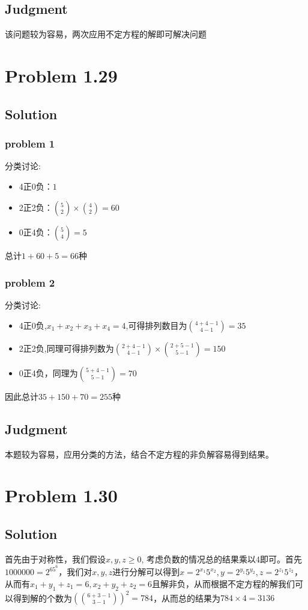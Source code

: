 \documentclass[a4paper]{ctexart}
\begin{document}
\subsection{Judgment}
该问题较为容易，两次应用不定方程的解即可解决问题
\section{Problem 1.29}
\subsection{Solution}
\subsubsection{problem 1}
分类讨论:
\begin{itemize}
    \item 4正0负：$1$
    \item 2正2负：$\binom{5}{2}\times\binom{4}{2}=60$
    \item 0正4负：$\binom{5}{4}=5$
\end{itemize}
\par
总计$1+60+5=66$种
\subsubsection{problem 2}
分类讨论:
\begin{itemize}
    \item 4正0负,$x_1+x_2+x_3+x_4=4$,可得排列数目为$\binom{4+4-1}{4-1}=35$
    \item 2正2负,同理可得排列数为$\binom{2+4-1}{4-1}\times\binom{2+5-1}{5-1}=150$
    \item 0正4负，同理为$\binom{5+4-1}{5-1}=70$
\end{itemize}
\par
因此总计$35+150+70=255$种
\subsection{Judgment}
本题较为容易，应用分类的方法，结合不定方程的非负解容易得到结果。
\section{Problem 1.30}
\subsection{Solution}
首先由于对称性，我们假设$x,y,z\geq 0$, 考虑负数的情况总的结果乘以4即可。首先$1000000=2^65^6$，我们对$x,y,z$进行分解可以得到$x=2^{x_1}5^{x_2},y=2^{y_1}5^{y_2},z=2^{z_1}5^{z_2}$，从而有$x_1+y_1+z_1=6,x_2+y_2+z_2=6$且解非负，从而根据不定方程的解我们可以得到解的个数为$(\binom{6+3-1}{3-1})^2=784$，从而总的结果为$784\times 4=3136$
\end{document}
